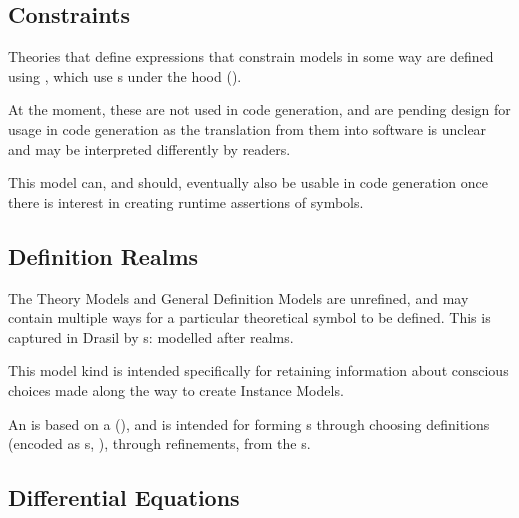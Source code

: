 \subsection{Constraints}

\currentConstraintSetHaskell{}

Theories that define expressions that constrain models in some way are defined
using \EquationalConstraints{}, which use \ConstraintSet{}s under the hood
().
	
At the moment, these are not used in code generation, and are pending design for
usage in code generation as the translation from them into software is unclear
and may be interpreted differently by readers.

This model can, and should, eventually also be usable in code generation once
there is interest in creating runtime assertions of symbols.


\subsection{Definition Realms}

\currentDefiningExprHaskell{}

\currentMultiDefnHaskell{}

The Theory Models and General Definition Models are unrefined, and may contain
multiple ways for a particular theoretical symbol to be defined. This is
captured in Drasil by \EquationalRealm{}s: modelled after realms.

This model kind is intended specifically for retaining information about
conscious choices made along the way to create Instance Models.

An \EquationalRealm{} is based on a \MultiDefn{}
(), and is intended for forming \QDefinition{}s
through choosing definitions (encoded as \DefiningExpr{}s,
), through refinements, from the \MultiDefn{}s.


\subsection{Differential Equations}

